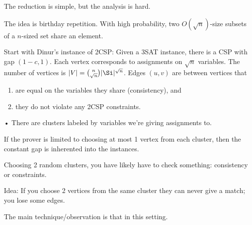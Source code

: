 The reduction is simple, but the analysis is hard.

The idea is birthday repetition. With high probability, two $O(\sqrt n)$-size subsets of a $n$-sized set share an element.

Start with Dinur's instance of 2CSP: Given a 3SAT instance, there is a CSP with gap $(1-c,1)$. 
Each vertex corresponds to assignments on $\sqrt n$ variables. The number of vertices is $|V|=\binom{n}{\sqrt n}|\Si|^{\sqrt n}$.
Edges $(u,v)$ are between vertices that
\begin{enumerate}
\item
are equal on the variables they share (consistency), and
\item 
they do not violate any 2CSP constraints.
\end{enumerate}•
There are clusters labeled by variables we're giving assignments to.
%
 
If the prover is limited to choosing at most 1 vertex from each cluster, then the constant gap is inherented into the instances.


Choosing 2 random clusters, you have likely have to check something: consistency or constraints.

Idea: If you choose 2 vertices from the same cluster they can never give a match; you lose some edges.

The main technique/observation is that in this setting. %

